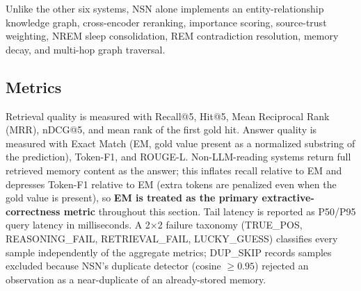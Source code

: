 \documentclass[conference]{IEEEtran}
\begin{document}
Unlike the other six systems, NSN alone implements an entity-relationship knowledge graph, cross-encoder reranking, importance scoring, source-trust weighting, NREM sleep consolidation, REM contradiction resolution, memory decay, and multi-hop graph traversal.

\subsection{Metrics}
Retrieval quality is measured with Recall@5, Hit@5, Mean Reciprocal Rank (MRR), nDCG@5, and mean rank of the first gold hit. Answer quality is measured with Exact Match (EM, gold value present as a normalized substring of the prediction), Token-F1, and ROUGE-L. Non-LLM-reading systems return full retrieved memory content as the answer; this inflates recall relative to EM and depresses Token-F1 relative to EM (extra tokens are penalized even when the gold value is present), so \textbf{EM is treated as the primary extractive-correctness metric} throughout this section. Tail latency is reported as P50/P95 query latency in milliseconds. A 2$\times$2 failure taxonomy (TRUE\_POS, REASONING\_FAIL, RETRIEVAL\_FAIL, LUCKY\_GUESS) classifies every sample independently of the aggregate metrics; DUP\_SKIP records samples excluded because NSN's duplicate detector (cosine $\geq 0.95$) rejected an observation as a near-duplicate of an already-stored memory.
\end{document}
